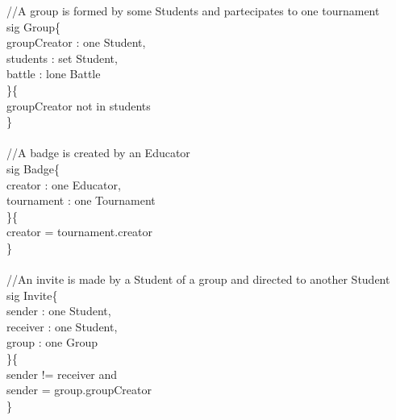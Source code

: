 \documentclass{article}
\begin{document}
{\color{gray}
//A group is formed by some Students and partecipates to one tournament\\
\color{blue}
sig
\color{black}
Group\{\\
\-\hspace{1cm}    groupCreator : \color{blue} one \color{black} Student,\\
\-\hspace{1cm}    students : \color{blue} set \color{black} Student,\\
\-\hspace{1cm}    battle : \color{blue} lone \color{black} Battle\\
\}\{\\
\-\hspace{1cm}    groupCreator \color{blue} not in \color{black} students	\\
\}\\
\\
\color{gray}
//A badge is created by an Educator\\
\color{blue}
sig
\color{black}
Badge\{\\
\-\hspace{1cm}    creator : \color{blue} one \color{black} Educator,\\
\-\hspace{1cm}    tournament : \color{blue} one \color{black} Tournament\\
\}\{\\
\-\hspace{1cm}    creator \color{blue} = \color{black} tournament.creator\\
\}\\
\\
\color{gray}
//An invite is made by a Student of a group and directed to another Student\\
\color{blue}
sig
\color{black}
Invite\{\\
\-\hspace{1cm}    sender : \color{blue} one \color{black} Student,\\
\-\hspace{1cm}    receiver : \color{blue} one \color{black} Student,\\
\-\hspace{1cm}    group : \color{blue} one \color{black} Group\\
\}\{\\
\-\hspace{1cm}    sender \color{blue} != \color{black} receiver \color{blue} and \color{black}\\
\-\hspace{1cm}    sender \color{blue} = \color{black} group.groupCreator \\
\}\\
\\

}
\end{document}
